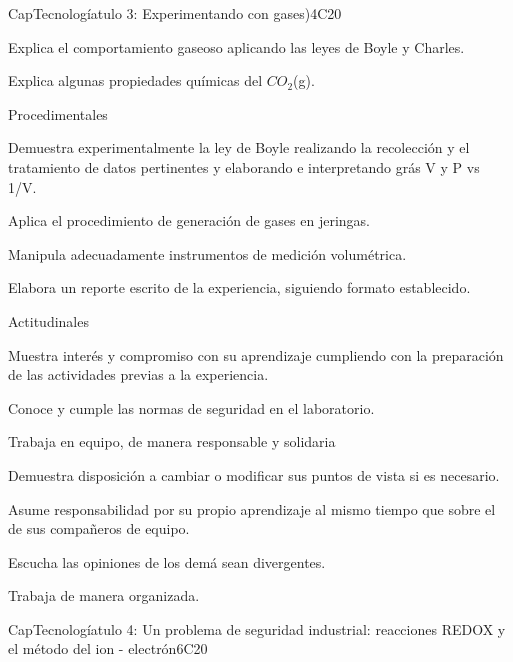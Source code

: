 \begin{syllabus}
\begin{unit}{CapTecnologíatulo 3: Experimentando con gases)}{}{}{4}{C20}
\begin{topics}
      \item Explica el comportamiento gaseoso aplicando las leyes de Boyle y Charles.
      \item Explica algunas propiedades químicas del $CO_2$(g).
   \end{topics}
   
   Procedimentales

\begin{topics}
      \item Demuestra experimentalmente la ley de Boyle realizando la recolección y el tratamiento de datos pertinentes y elaborando e interpretando grás V y P vs 1/V.
      \item Aplica el procedimiento de generación de gases en jeringas.
      \item Manipula adecuadamente instrumentos de medición volumétrica. 
      \item Elabora un reporte escrito de la experiencia, siguiendo formato establecido.
   \end{topics}
   
   Actitudinales

\begin{topics}
      \item Muestra interés y compromiso con su aprendizaje cumpliendo con la preparación de las actividades previas a la experiencia.
      \item Conoce y cumple las normas de seguridad en el laboratorio.
      \item Trabaja en equipo, de manera responsable y solidaria
      \item Demuestra disposición a cambiar o modificar sus puntos de vista si es necesario.
     \item Asume responsabilidad por su propio aprendizaje al mismo tiempo que sobre el de sus compañeros de equipo.
      \item Escucha las opiniones de los demá sean divergentes.
     \item Trabaja de manera organizada.
   \end{topics}

   \begin{learningoutcomes}
      \item 
   \end{learningoutcomes}
\end{unit}

\begin{unit}{CapTecnologíatulo 4: Un problema de seguridad industrial: reacciones REDOX y el método del ion - electrón}{}{}{6}{C20}


\end{unit}
\end{syllabus}
